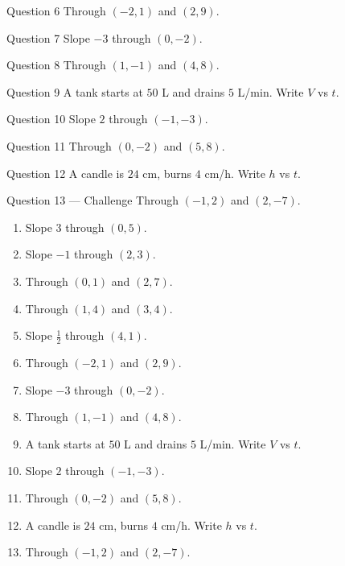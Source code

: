 \documentclass[11pt]{article}
\begin{document}
\begin{qbox}{Question 6}
Through $(-2,1)$ and $(2,9)$.\workspace{2.2cm}
\end{qbox}

\begin{qbox}{Question 7}
Slope $-3$ through $(0,-2)$.\workspace{1.8cm}
\end{qbox}

\begin{qbox}{Question 8}
Through $(1,-1)$ and $(4,8)$.\workspace{2.2cm}
\end{qbox}

\begin{qbox}{Question 9}
A tank starts at $50$ L and drains $5$ L/min. Write $V$ vs $t$.\workspace{2.2cm}
\end{qbox}

\begin{qbox}{Question 10}
Slope $2$ through $(-1,-3)$.\workspace{2.0cm}
\end{qbox}

\begin{qbox}{Question 11}
Through $(0,-2)$ and $(5,8)$.\workspace{2.2cm}
\end{qbox}

\begin{qbox}{Question 12}
A candle is $24$ cm, burns $4$ cm/h. Write $h$ vs $t$.\workspace{2.2cm}
\end{qbox}

\begin{qbox}{Question 13 --- Challenge}
Through $(-1,2)$ and $(2,-7)$.\workspace{2.4cm}
\end{qbox}

\clearpage
{}

\begin{recapbox}
\begin{multicols}{2}
\small
\begin{enumerate}[leftmargin=*,itemsep=3pt]
  \item Slope $3$ through $(0,5)$.
  \item Slope $-1$ through $(2,3)$.
  \item Through $(0,1)$ and $(2,7)$.
  \item Through $(1,4)$ and $(3,4)$.
  \item Slope $\tfrac12$ through $(4,1)$.
  \item Through $(-2,1)$ and $(2,9)$.
  \item Slope $-3$ through $(0,-2)$.
  \item Through $(1,-1)$ and $(4,8)$.
  \item A tank starts at $50$ L and drains $5$ L/min. Write $V$ vs $t$.
  \item Slope $2$ through $(-1,-3)$.
  \item Through $(0,-2)$ and $(5,8)$.
  \item A candle is $24$ cm, burns $4$ cm/h. Write $h$ vs $t$.
  \item Through $(-1,2)$ and $(2,-7)$.
\end{enumerate}
\end{multicols}
\end{recapbox}
\end{document}
